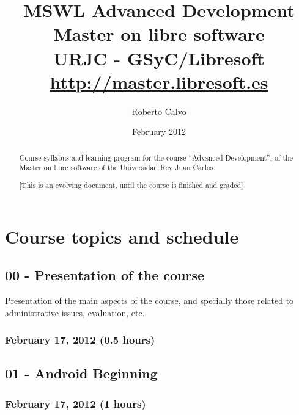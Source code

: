 \documentclass[a4paper]{article}
\title{MSWL Advanced Development \\
Master on libre software \\
URJC - GSyC/Libresoft \\
\url{http://master.libresoft.es}}
\author{Roberto Calvo}
\date{February 2012}
\begin{document}
\maketitle

\begin{abstract}
Course syllabus and learning program for the course ``Advanced
Development'', of the Master on libre software of the Universidad Rey
Juan Carlos.


[This is an evolving document, until the course is finished and graded]
\end{abstract}

\tableofcontents

\section{Course topics and schedule}

\subsection{00 - Presentation of the course}

Presentation of the main aspects of the course, and specially those
related to administrative issues, evaluation, etc.

\subsubsection{February 17, 2012 (0.5 hours)}


\subsection{01 - Android Beginning}


\subsubsection{February 17, 2012 (1 hours)}
\end{document}
